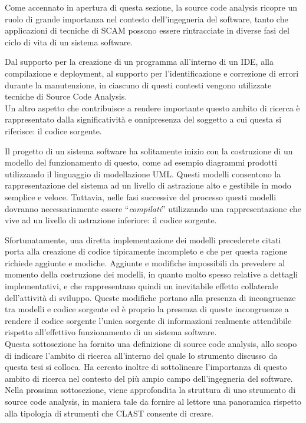 Come accennato in apertura di questa sezione, la source code analysis ricopre un
ruolo di grande importanza nel contesto dell'ingegneria del software, tanto che
applicazioni di tecniche di SCAM possono essere rintracciate in diverse fasi
del ciclo di vita di un sistema software.

Dal supporto per la creazione di un programma all’interno di un IDE, alla
compilazione e deployment, al supporto per l'identificazione e correzione di
errori durante la manutenzione, in ciascuno di questi contesti vengono
utilizzate tecniche di Source Code Analysis.\\

Un altro aspetto che contribuisce a rendere importante questo ambito di ricerca
è rappresentato dalla significatività e onnipresenza del soggetto a cui questa
si riferisce: il codice sorgente.

Il progetto di un sistema software ha solitamente inizio con la costruzione di
un modello del funzionamento di questo, come ad esempio diagrammi prodotti
utilizzando il linguaggio di modellazione UML. Questi modelli consentono la
rappresentazione del sistema ad un livello di astrazione alto e gestibile in
modo semplice e veloce. Tuttavia, nelle fasi successive del processo questi
modelli dovranno necessariamente essere \enquote{\textit{compilati}} utilizzando
una rappresentazione che vive ad un livello di astrazione inferiore: il codice
sorgente.

Sfortunatamente, una diretta implementazione dei modelli precederete citati
porta alla creazione di codice tipicamente incompleto e che per questa ragione
richiede aggiunte e modiche. Aggiunte e modifiche impossibili da prevedere al
momento della costruzione dei modelli, in quanto molto spesso relative a
dettagli implementativi, e che rappresentano quindi un inevitabile effetto
collaterale dell'attività di sviluppo. Queste modifiche portano alla presenza di
incongruenze tra modelli e codice sorgente ed è proprio la presenza di queste
incongruenze a rendere il codice sorgente l’unica sorgente di informazioni
realmente attendibile rispetto all’effettivo funzionamento di un sistema
software.\\

Questa sottosezione ha fornito una definizione di source code analysis, allo
scopo di indicare l'ambito di ricerca all'interno del quale lo strumento
discusso da questa tesi si colloca. Ha cercato inoltre di sottolineare
l'importanza di questo ambito di ricerca nel contesto del più ampio campo
dell'ingegneria del software. Nella prossima sottosezione, viene approfondita la
struttura di uno strumento di source code analysis, in maniera tale da fornire
al lettore una panoramica rispetto alla tipologia di strumenti che CLAST
consente di creare.

